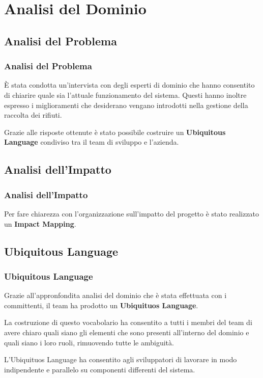 \section{Analisi del Dominio}
\frame{\tableofcontents[currentsection]}


\subsection{Analisi del Problema}

\begin{frame}
    \frametitle{Analisi del Problema}
    È stata condotta un'intervista con degli esperti di dominio che hanno consentito di chiarire quale sia l'attuale
    funzionamento del sistema.
    Questi hanno inoltre espresso i miglioramenti che desiderano vengano introdotti nella gestione della raccolta dei
    rifiuti.

    \bigskip

    Grazie alle risposte ottenute è stato possibile costruire un \textbf{Ubiquitous Language} condiviso tra il team di sviluppo
    e l'azienda.

\end{frame}

\subsection{Analisi dell'Impatto}

\begin{frame}
    \frametitle{Analisi dell'Impatto}
    Per fare chiarezza con l'organizzazione sull'impatto del progetto è stato realizzato un \textbf{Impact Mapping}.

\end{frame}

\subsection{Ubiquitous Language}

\begin{frame}
    \frametitle{Ubiquitous Language}
    Grazie all'appronfondita analisi del dominio che è stata effettuata con i committenti, il team ha prodotto un
    \textbf{Ubiquituos Language}.

    \bigskip

    La costruzione di questo vocabolario ha consentito a tutti i membri del team di avere chiaro quali siano gli
    elementi che sono presenti all'interno del dominio e quali siano i loro ruoli, rimuovendo tutte le ambiguità.

    \bigskip

    L'Ubiquituos Language ha consentito agli sviluppatori di lavorare in modo indipendente e parallelo su componenti
    differenti del sistema.

\end{frame}
